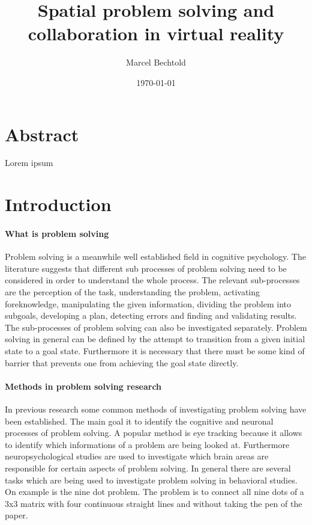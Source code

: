 \documentclass{article}
\title{Spatial problem solving and collaboration in virtual reality}
\author{Marcel Bechtold}
\date{\today}
\begin{document}
\maketitle


\section{Abstract}

Lorem ipsum

\section{Introduction} \label{sec:introduction}
\paragraph{What is problem solving}
Problem solving is a meanwhile well established field in cognitive psychology. The literature suggests that different sub processes of problem solving need to be considered in order to understand the whole process. The relevant sub-processes are the perception of the task, understanding the problem, activating foreknowledge, manipulating the given information, dividing the problem into subgoals, developing a plan, detecting errors and finding and validating results. The sub-processes of problem solving can also be investigated separately. Problem solving in general can be defined by the attempt to transition from a given initial state to a goal state. Furthermore it is necessary that there must be some kind of barrier that prevents one from achieving the goal state directly. \cite{muesseler2015allgemeine}

\paragraph{Methods in problem solving research}
In previous research some common methods of investigating problem solving have been established. The main goal it to identify the cognitive and neuronal processes of problem solving. A popular method is eye tracking because it allows to identify which informations of a problem are being looked at. \cite{underwood2005}  Furthermore neuropsychological studies are used to investigate which brain areas are responsible for certain aspects of problem solving. \cite{Karnath2006} In general there are several tasks which are being used to investigate problem solving in behavioral studies. On example is the nine dot problem. The problem is to connect all nine dots of a 3x3 matrix with four continuous straight lines and without taking the pen of the paper.
\end{document}
